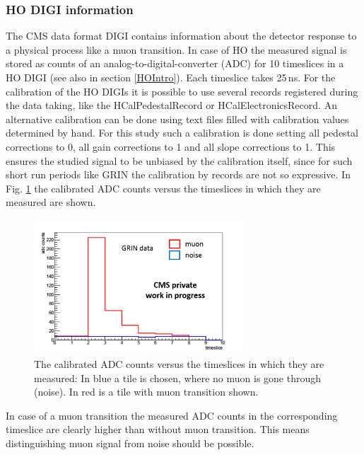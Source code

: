 		\subsubsection{HO DIGI information}
			The CMS data format DIGI contains information about the detector response to a physical process like a muon transition.
			In case of HO the measured signal is stored as counts of an analog-to-digital-converter (ADC) for 10 timeslices in a HO DIGI (see also in section \ref{HOIntro}).
			Each timeslice takes 25\,ns.
			For the calibration of the HO DIGIs it is possible to use several records registered during the data taking, like the HCalPedestalRecord or HCalElectronicsRecord.
			An alternative calibration can be done using text files filled with calibration values determined by hand.
			For this study such a calibration is done setting all pedestal corrections to 0, all gain corrections to 1 and all slope corrections to 1.
			This ensures the studied signal to be unbiased by the calibration itself, since for such short run periods like GRIN the calibration by records are not so expressive.
			In Fig. \ref{fig:adc_vs_ts} the calibrated ADC counts versus the timeslices in which they are measured are shown.
			\begin{figure}[htbp]
				\centering
				\includegraphics[width=0.70\textwidth]{Figures/erdogan/adc_vs_ts.png}
				\caption{The calibrated ADC counts versus the timeslices in which they are measured: In blue a tile is chosen, where no muon is gone through (noise). In red is a tile with muon transition shown.}
				\label{fig:adc_vs_ts}
			\end{figure}
			In case of a muon transition the measured ADC counts in the corresponding timeslice are clearly higher than without muon transition.
			This means distinguishing muon signal from noise should be possible.
